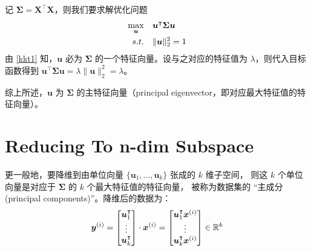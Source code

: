 		记 $ \bm{\Sigma} = \bm{X}^\intercal \bm{X} $，则我们要求解优化问题
		\begin{align}
			\max_{\bm{u}} \quad & \bm{u}^\intercal \bm{\Sigma} \bm{u} \\
			s.t. \quad & \| \bm{u} \|_2^2 = 1
		\end{align}
		由 \eqref{kkt1} 知，$ \bm{u} $ 必为 $ \bm{\Sigma} $ 的一个特征向量。设与之对应的特征值为 $ \lambda $，则代入目标函数得到 $ \bm{u}^\intercal \bm{\Sigma} \bm{u} = \lambda \| \bm{u} \|_2^2 = \lambda $。
		
		综上所述，$ \bm{u} $ 为 $ \bm{\Sigma} $ 的主特征向量（principal eigenvector，即对应最大特征值的特征向量）。
		
	\section{Reducing To n-dim Subspace}
		更一般地，要降维到由单位向量 $ \{ \bm{u}_1, \ldots, \bm{u}_k \} $ 张成的 $ k $ 维子空间，
		则这 $ k $ 个单位向量是对应于 $ \bm{\Sigma} $ 的 $ k $ 个最大特征值的特征向量，
		被称为数据集的 “主成分(principal components)”。降维后的数据为：
		\begin{equation}
			\bm{y}^{(i)} = 
			\begin{bmatrix}
				\bm{u}_1^\intercal \\
				\vdots \\
				\bm{u}_k^\intercal
			\end{bmatrix} \cdot \bm{x}^{(i)} \\
			= \begin{bmatrix}
				\bm{u}_1^\intercal \bm{x}^{(i)} \\
				\vdots \\
				\bm{u}_k^\intercal \bm{x}^{(i)}
			\end{bmatrix} \in \mathbb{R}^k
		\end{equation}